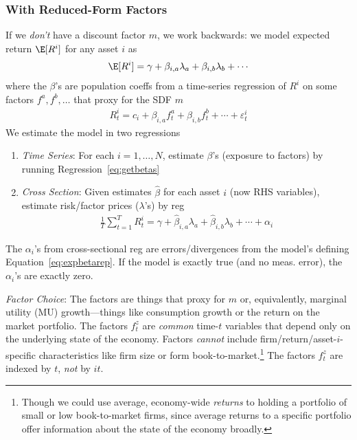 \documentclass[12pt]{article}
\theoremstyle{plain}
\theoremstyle{definition}
\theoremstyle{remark}
\newcommand{\sumtT}{\sum^T_{t=1}}
\begin{document}
\begin{multicols*}{2}
\subsubsection{With Reduced-Form Factors}

If we \emph{don't} have a discount factor $m$, we work backwards: we
model expected return $\E[R^i]$ for any asset $i$ as
\begin{align}
  \E[R^i]
  = \gamma + \beta_{i,a}\lambda_a + \beta_{i,b} \lambda_b + \cdots
  \label{eq:expbetarep}
\end{align}
where the $\beta$'s are population coeffs from a time-series regression
of $R^i$ on some factors $f^a, f^b,\ldots$ that proxy for the SDF $m$
\begin{align}
  R_t^i = c_i + \beta_{i,a} f_t^a + \beta_{i,b} f_t^b + \cdots
  + \varepsilon^i_t
  \label{eq:getbetas}
\end{align}
We estimate the model in two regressions
\begin{enumerate}[label=(\roman*)]
  \item
    \emph{Time Series}:
    For each $i=1,\ldots,N$, estimate $\beta$'s (exposure to factors) by
    running Regression~\ref{eq:getbetas}
  \item
    \emph{Cross Section}:
    Given estimates $\hat{\beta}$ for each asset $i$ (now RHS
    variables), estimate risk/factor prices ($\lambda$'s)
    by reg
    \begin{align*}
      \frac{1}{T}\sumtT
      R^i_t
      = \gamma + \hat{\beta}_{i,a}\lambda_a + \hat{\beta}_{i,b}
      \lambda_b + \cdots
      + \alpha_i
    \end{align*}
\end{enumerate}
The $\alpha_i$'s from cross-sectional reg are errors/divergences
from the model's defining Equation~\ref{eq:expbetarep}. If the model is
exactly true (and no meas. error), the $\alpha_i$'s are exactly
zero.
\columnbreak

\emph{Factor Choice}: The factors are things that proxy for $m$ or,
equivalently, marginal utility (MU) growth---things like consumption
growth or the return on the market portfolio.
The factors $f_t^z$ are \emph{common} time-$t$ variables that depend
only on the underlying state of the economy. Factors \emph{cannot}
include firm/return/asset-$i$-specific characteristics like firm size or
form book-to-market.\footnote{%
  Though we could use average, economy-wide \emph{returns} to holding a
  portfolio of small or low book-to-market firms, since average
  returns to a specific portfolio offer information about the state of
  the economy broadly.
}
The factors $f^z_t$ are indexed by $t$, \emph{not} by $it$.


\end{multicols*}
\end{document}
